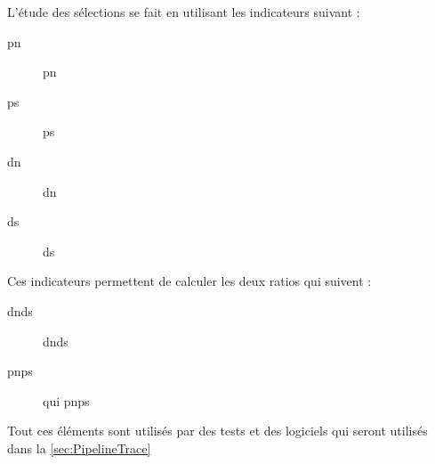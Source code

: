 \documentclass[../main]{subfiles} %
\begin{document}
L'étude des sélections se fait en utilisant les indicateurs suivant :


\begin{description}
    \item [\acrshort{pn}] \acrlong{pn}
    \item [\acrshort{ps}] \acrlong{ps}
    \item [\acrshort{dn}] \acrlong{dn}
    \item [\acrshort{ds}] \acrlong{ds}
\end{description}


Ces indicateurs permettent de calculer les deux ratios qui suivent :
\begin{description}
    \item [\acrshort{dnds}] \acrlong{dnds}
    \item [\acrshort{pnps}] qui \acrlong{pnps}
\end{description}
Tout ces éléments sont utilisés par des tests et des logiciels qui seront utilisés dans la  \cref{sec:PipelineTrace}


\end{document}
